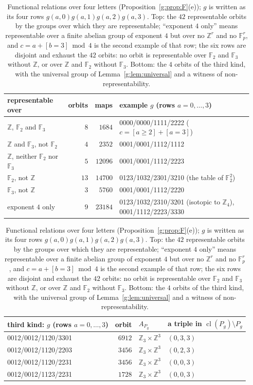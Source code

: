\documentclass[11pt]{article}
\theoremstyle{definition}
\theoremstyle{remark}
\newcommand{\Z}{\mathbb{Z}}
\newcommand{\F}{\mathbb{F}_2}
\newcommand{\Fp}{\mathbb{F}_p}
\DeclareMathOperator{\cl}{cl}
\begin{document}
\begin{table}[ht]
\centering\small
\renewcommand{\arraystretch}{1.1}
\begin{tabular}{@{}l r r l@{}}
representable over & orbits & maps & example $g$ (rows $a=0,\dots,3$)\\\hline
$\Z$, $\F$ and $\mathbb F_3$ & $8$ & $1684$ & 0000/0000/1111/2222 ($c=[a\ge2]+[a=3]$)\\
$\Z$ and $\mathbb F_3$, not $\F$ & $4$ & $2352$ & 0001/0001/1112/1112\\
$\Z$, neither $\F$ nor $\mathbb F_3$ & $5$ & $12096$ & 0001/0001/1112/2223\\
$\F$, not $\Z$ & $13$ & $14700$ & 0123/1032/2301/3210 (the table of $\F^2$)\\
$\mathbb F_3$, not $\Z$ & $3$ & $5760$ & 0001/0001/1112/2220\\
exponent $4$ only & $9$ & $23184$ & 0123/1032/2310/3201 (isotopic to $\Z_4$), 0001/1112/2223/3330
\end{tabular}

\medskip
\begin{tabular}{@{}l r l l@{}}
third kind: $g$ (rows $a=0,\dots,3$) & orbit & $A_{P_g}$ & a triple in $\cl(P_g)\setminus P_g$\\\hline
0012/0012/1120/3301 & $6912$ & $\Z_3\times\Z^3$ & $(0,3,3)$\\
0012/0012/1120/2203 & $3456$ & $\Z_3\times\Z^3$ & $(0,2,3)$\\
0012/0012/1120/2231 & $3456$ & $\Z_3\times\Z^3$ & $(0,0,3)$\\
0012/0012/1123/2231 & $1728$ & $\Z_3\times\Z^3$ & $(0,0,3)$
\end{tabular}
\caption{Functional relations over four letters (Proposition~\ref{g:prop:F}(e)); $g$ is written as its four rows $g(a,0)g(a,1)g(a,2)g(a,3)$. Top: the $42$ representable orbits by the groups over which they are representable; ``exponent $4$ only'' means representable over a finite abelian group of exponent $4$ but over no $\Z^r$ and no $\Fp^r$, and $c=a+[b=3]\bmod4$ is the second example of that row; the six rows are disjoint and exhaust the $42$ orbits: no orbit is representable over $\F$ and $\mathbb F_3$ without $\Z$, or over $\Z$ and $\F$ without $\mathbb F_3$. Bottom: the $4$ orbits of the third kind, with the universal group of Lemma~\ref{g:lem:universal} and a witness of non-representability.}
\label{g:tab:functional4}
\end{table}
\end{document}
